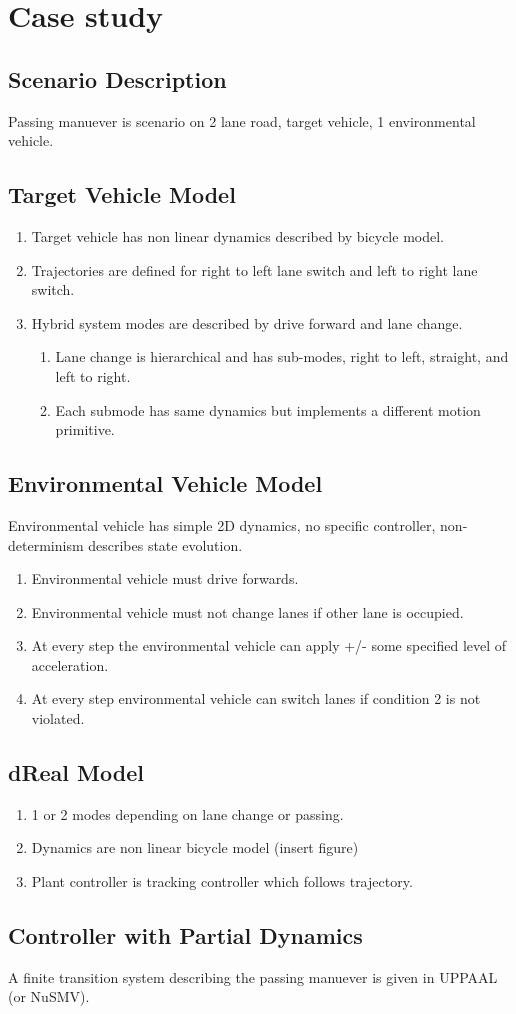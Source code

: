 \section{Case study}
\label{caseStudy}

\subsection{Scenario Description}
Passing manuever is scenario on 2 lane road, target vehicle, 1 environmental vehicle.
\subsection{Target Vehicle Model}
\begin{enumerate}
			\item Target vehicle has non linear dynamics described by bicycle model.
			\item Trajectories are defined for right to left lane switch and left to right lane switch.
			\item Hybrid system modes are described by drive forward and lane change.
					\begin{enumerate}
						\item Lane change is hierarchical and has sub-modes, right to left, straight, and left to right.
						\item Each submode has same dynamics but implements a different motion primitive.
					\end{enumerate}
\end{enumerate}
\subsection{Environmental Vehicle Model}
 Environmental vehicle has simple 2D dynamics, no specific controller, non-determinism describes state evolution.
 \begin{enumerate}
 	\item Environmental vehicle must drive forwards.
 	\item Environmental vehicle must not change lanes if other lane is occupied.
 	\item At every step the environmental vehicle can apply +/- some specified level of acceleration.
 	\item At every step environmental vehicle can switch lanes if condition 2 is not violated.
 \end{enumerate}
\subsection{dReal Model}
\begin{enumerate}
	\item 1 or 2 modes depending on lane change or passing.
	\item Dynamics are non linear bicycle model (insert figure)
	\item Plant controller is tracking controller which follows trajectory.
\end{enumerate}
\subsection{Controller with Partial Dynamics}
A finite transition system describing the passing manuever is given in UPPAAL (or NuSMV).

